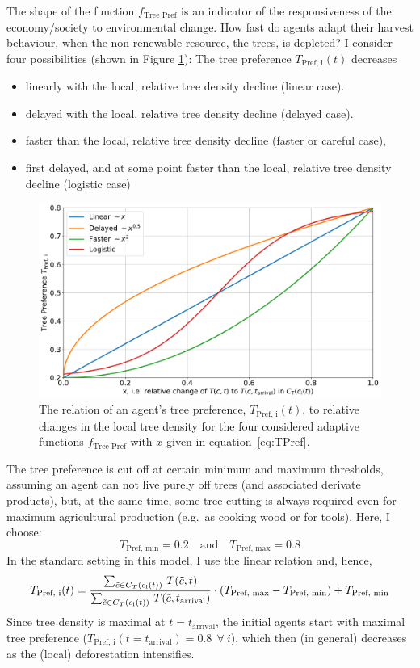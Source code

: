 The shape of the function $f_\text{Tree Pref}$ is an indicator of the responsiveness of the economy/society to environmental change. How fast do agents adapt their harvest behaviour, when the non-renewable resource, the trees, is depleted?
I consider four possibilities (shown in Figure \ref{fig:TPref_T}): The tree preference $T_\text{Pref, i}(t)$ decreases
\begin{itemize}
	\item linearly with the local, relative tree density decline (linear case).  
	\item delayed with the local, relative tree density decline (delayed case).
	\item faster than the local, relative tree density decline (faster or careful case),
	\item first delayed, and at some point faster than the local, relative tree density decline (logistic case) 
\end{itemize}
\begin{figure}
	\centering
	\includegraphics[width=\textwidth]{images/TPref}
	\caption{The relation of an agent's tree preference, $T_\text{Pref, i}(t)$, to relative changes in the local tree density for the four considered adaptive functions $f_\text{Tree Pref}$ with $x$ given in equation~\ref{eq:TPref}.}
	\label{fig:TPref_T}
\end{figure}
The tree preference is cut off at certain minimum and maximum thresholds, assuming an agent can not live purely off trees (and associated derivate products), but, at the same time, some tree cutting is always required even for maximum agricultural production (e.g.\ as cooking wood or for tools). 
Here, I choose: 
\begin{equation}
T_\text{Pref, min} = 0.2 \quad \text{and} \quad T_\text{Pref, max} = 0.8
\end{equation} 
In the standard setting in this model, I use the linear relation and, hence, 
\begin{equation}
	T_\text{Pref, i}(t) =  \frac{\sum_{\tilde{c} \in C_{T}(c_{\rm i}(t)) } \, T(\tilde{c}, t)}{\sum_{\tilde{c} \in C_{T}(c_{\rm i}(t))} \, T(\tilde{c}, t_\text{arrival}) } \cdot (T_\text{Pref, max}-T_\text{Pref, min}) + T_\text{Pref, min}
\end{equation}
Since tree density is maximal at $t=t_\text{arrival}$, the initial agents start with maximal tree preference ($T_\text{Pref, i}(t=t_\text{arrival}) = 0.8 \ \  \forall \ i$), which then (in general) decreases as the (local) deforestation intensifies.


